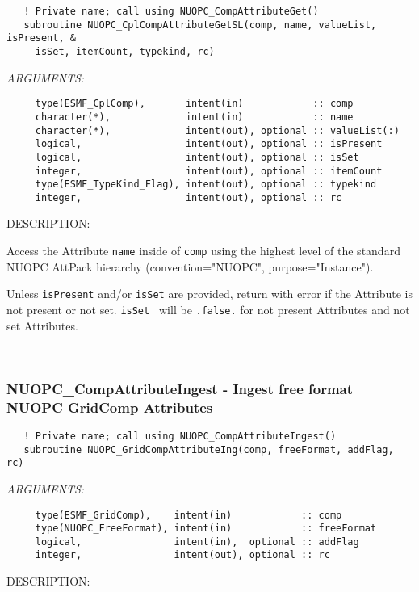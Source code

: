 \begin{verbatim}   ! Private name; call using NUOPC_CompAttributeGet() 
   subroutine NUOPC_CplCompAttributeGetSL(comp, name, valueList, isPresent, &
     isSet, itemCount, typekind, rc)\end{verbatim}{\em ARGUMENTS:}
\begin{verbatim}     type(ESMF_CplComp),       intent(in)            :: comp
     character(*),             intent(in)            :: name
     character(*),             intent(out), optional :: valueList(:)
     logical,                  intent(out), optional :: isPresent
     logical,                  intent(out), optional :: isSet
     integer,                  intent(out), optional :: itemCount
     type(ESMF_TypeKind_Flag), intent(out), optional :: typekind
     integer,                  intent(out), optional :: rc\end{verbatim}
{\sf DESCRIPTION:\\ }


     Access the Attribute {\tt name} inside of {\tt comp} using the highest level
     of the standard NUOPC AttPack hierarchy (convention="NUOPC", 
     purpose="Instance").
  
     Unless {\tt isPresent} and/or {\tt isSet} are provided, return with error
     if the Attribute is not present or not set. {\tt isSet } will be 
     {\tt .false.} for not present Attributes and not set Attributes. 
 
\mbox{}\hrulefill\ 
 
\subsubsection [NUOPC\_CompAttributeIngest] {NUOPC\_CompAttributeIngest - Ingest free format NUOPC GridComp Attributes}


\begin{verbatim}   ! Private name; call using NUOPC_CompAttributeIngest() 
   subroutine NUOPC_GridCompAttributeIng(comp, freeFormat, addFlag, rc)\end{verbatim}{\em ARGUMENTS:}
\begin{verbatim}     type(ESMF_GridComp),    intent(in)            :: comp
     type(NUOPC_FreeFormat), intent(in)            :: freeFormat
     logical,                intent(in),  optional :: addFlag
     integer,                intent(out), optional :: rc\end{verbatim}
{\sf DESCRIPTION:\\ }


